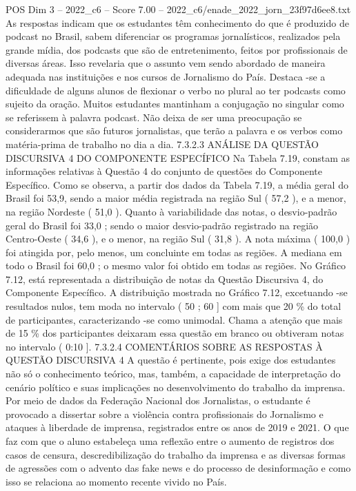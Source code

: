 \begin{textsample}{POS Dim 3 – 2022\_c6 – Score 7.00 – 2022\_c6/enade\_2022\_jorn\_23f97d6ee8.txt}
As respostas indicam que os estudantes têm conhecimento do que é produzido de podcast no Brasil, sabem diferenciar os programas jornalísticos, realizados pela grande mídia, dos podcasts que são de entretenimento, feitos por profissionais de diversas áreas.
Isso revelaria que o assunto vem sendo abordado de maneira adequada nas instituições e nos cursos de Jornalismo do País.
Destaca -se a dificuldade de alguns alunos de flexionar o verbo no plural ao ter podcasts como sujeito da oração.
Muitos estudantes mantinham a conjugação no singular como se referissem à palavra podcast.
Não deixa de ser uma preocupação se considerarmos que são futuros jornalistas, que terão a palavra e os verbos como matéria-prima de trabalho no dia a dia. 7.3.2.3 ANÁLISE DA QUESTÃO DISCURSIVA 4 DO COMPONENTE ESPECÍFICO Na Tabela 7.19, constam as informações relativas à Questão 4 do conjunto de questões do Componente Específico.
Como se observa, a partir dos dados da Tabela 7.19, a média geral do Brasil foi 53,9, sendo a maior média registrada na região Sul ( 57,2 ), e a menor, na região Nordeste ( 51,0 ).
Quanto à variabilidade das notas, o desvio-padrão geral do Brasil foi 33,0 ; sendo o maior desvio-padrão registrado na região Centro-Oeste ( 34,6 ), e o menor, na região Sul ( 31,8 ).
A nota máxima ( 100,0 ) foi atingida por, pelo menos, um concluinte em todas as regiões.
A mediana em todo o Brasil foi 60,0 ; o mesmo valor foi obtido em todas as regiões.
No Gráfico 7.12, está representada a distribuição de notas da Questão Discursiva 4, do Componente Específico.
A distribuição mostrada no Gráfico 7.12, excetuando -se resultados nulos, tem moda no intervalo ( 50 ; 60 ] com mais que 20 \% do total de participantes, caracterizando -se como unimodal.
Chama a atenção que mais de 15 \% dos participantes deixaram essa questão em branco ou obtiveram notas no intervalo ( 0:10 ]. 7.3.2.4 COMENTÁRIOS SOBRE AS RESPOSTAS À QUESTÃO DISCURSIVA 4 A questão é pertinente, pois exige dos estudantes não só o conhecimento teórico, mas, também, a capacidade de interpretação do cenário político e suas implicações no desenvolvimento do trabalho da imprensa.
Por meio de dados da Federação Nacional dos Jornalistas, o estudante é provocado a dissertar sobre a violência contra profissionais do Jornalismo e ataques à liberdade de imprensa, registrados entre os anos de 2019 e 2021.
O que faz com que o aluno estabeleça uma reflexão entre o aumento de registros dos casos de censura, descredibilização do trabalho da imprensa e as diversas formas de agressões com o advento das fake news e do processo de desinformação e como isso se relaciona ao momento recente vivido no País.

\end{textsample}
